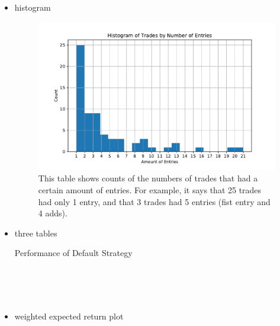 \documentclass{article}
\begin{document}
\begin{itemize}
	\item histogram
		
	\begin{figure}
	\includegraphics[width=\textwidth]{prog_entry_hist.pdf}
	\caption{This table shows counts of the numbers of trades that had a certain amount of entries. For example, it says that 25 trades had only 1 entry, and that 3 trades had 5 entries (fist entry and 4 adds).}
	\label{hist_strat}
	\end{figure}
	
	\item three tables
	
\begin{table}
\caption{Performance of Default Strategy}
\\[2ex]


\\[2ex]


\\[2ex]

\label{tab_strat}
\end{table}

	\item weighted expected return plot
	

\end{itemize}
\end{document}
